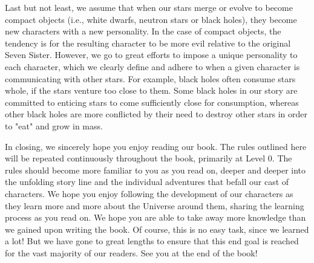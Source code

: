 \documentclass[main.tex]{subfiles}
\begin{document}
\par \nar Last but not least, we assume that when our stars merge or evolve to become compact objects (i.e., white dwarfs, neutron stars or black holes), they become new characters with a new personality.  In the case of compact objects, the tendency is for the resulting character to be more evil relative to the original Seven Sister.  However, we go to great efforts to impose a unique personality to each character, which we clearly define and adhere to when a given character is communicating with other stars.  For example, black holes often consume stars whole, if the stars venture too close to them.  Some black holes in our story are committed to enticing stars to come sufficiently close for consumption, whereas other black holes are more conflicted by their need to destroy other stars in order to "eat" and grow in mass.

\par \nar In closing, we sincerely hope you enjoy reading our book.  The rules outlined here will be repeated continuously throughout the book, primarily at Level 0.  The rules should become more familiar to you as you read on, deeper and deeper into the unfolding story line and the individual adventures that befall our cast of characters.  We hope you enjoy following the development of our characters as they learn more and more about the Universe around them, sharing the learning process as you read on.  We hope you are able to take away more knowledge than we gained upon writing the book.  Of course, this is no easy task, since we learned a lot!  But we have gone to great lengths to ensure that this end goal is reached for the vast majority of our readers.  See you at the end of the book!
\end{document}
